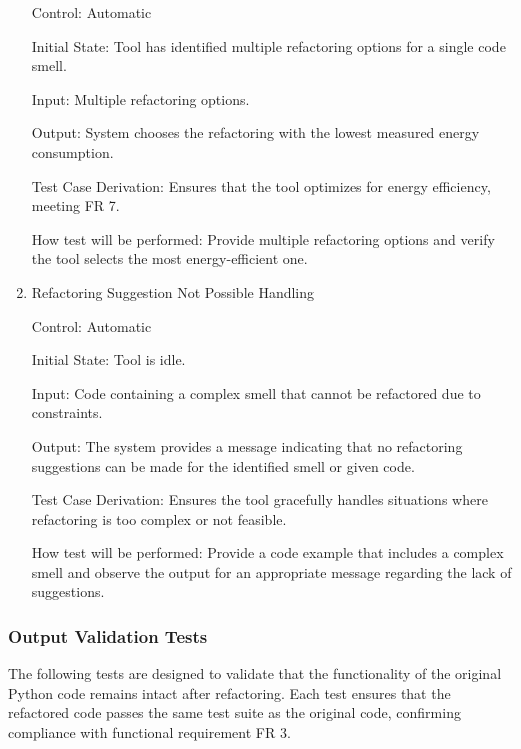 \documentclass[12pt, titlepage]{article}
\begin{document}
\begin{enumerate}
  Control: Automatic
            
  Initial State: Tool has identified multiple refactoring options for a single code smell.
            
  Input: Multiple refactoring options.
            
  Output: System chooses the refactoring with the lowest measured energy consumption.
  
  Test Case Derivation: Ensures that the tool optimizes for energy efficiency, meeting FR 7.
            
  How test will be performed: Provide multiple refactoring options and verify the tool selects the most energy-efficient one.
  
  \item{Refactoring Suggestion Not Possible Handling\\}

  Control: Automatic
  
  Initial State: Tool is idle.
  
  Input: Code containing a complex smell that cannot be refactored due to constraints.
  
  Output: The system provides a message indicating that no refactoring suggestions can be made for the identified smell or given code.
  
  Test Case Derivation: Ensures the tool gracefully handles situations where refactoring is too complex or not feasible.
  
  How test will be performed: Provide a code example that includes a complex smell and observe the output for an appropriate message regarding the lack of suggestions.

\end{enumerate}

\subsubsection{Output Validation Tests}

The following tests are designed to validate that the functionality of the original Python code remains intact after refactoring. Each test ensures that the refactored code passes the same test suite as the original code, confirming compliance with functional requirement FR 3.
		
\end{document}
